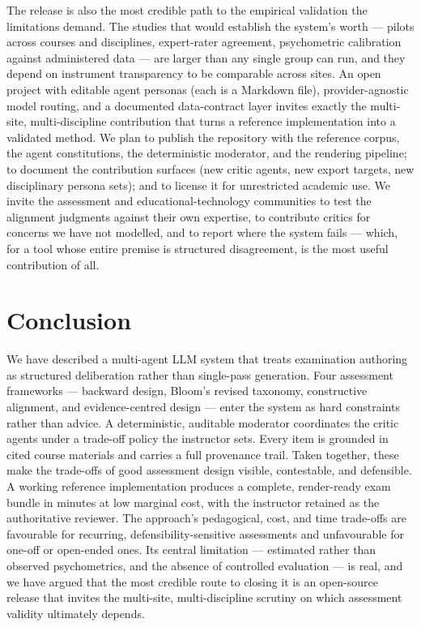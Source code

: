 \documentclass[
  11pt,
  letterpaper,
]{article}
\begin{document}
The release is also the most credible path to the empirical validation
the limitations demand. The studies that would establish the system's
worth --- pilots across courses and disciplines, expert-rater agreement,
psychometric calibration against administered data --- are larger than
any single group can run, and they depend on instrument transparency to
be comparable across sites. An open project with editable agent personas
(each is a Markdown file), provider-agnostic model routing, and a
documented data-contract layer invites exactly the multi-site,
multi-discipline contribution that turns a reference implementation into
a validated method. We plan to publish the repository with the reference
corpus, the agent constitutions, the deterministic moderator, and the
rendering pipeline; to document the contribution surfaces (new critic
agents, new export targets, new disciplinary persona sets); and to
license it for unrestricted academic use. We invite the assessment and
educational-technology communities to test the alignment judgments
against their own expertise, to contribute critics for concerns we have
not modelled, and to report where the system fails --- which, for a tool
whose entire premise is structured disagreement, is the most useful
contribution of all.

\section{Conclusion}\label{conclusion}

We have described a multi-agent LLM system that treats examination
authoring as structured deliberation rather than single-pass generation.
Four assessment frameworks --- backward design, Bloom's revised
taxonomy, constructive alignment, and evidence-centred design --- enter
the system as hard constraints rather than advice. A deterministic,
auditable moderator coordinates the critic agents under a trade-off
policy the instructor sets. Every item is grounded in cited course
materials and carries a full provenance trail. Taken together, these
make the trade-offs of good assessment design visible, contestable, and
defensible. A working reference implementation produces a complete,
render-ready exam bundle in minutes at low marginal cost, with the
instructor retained as the authoritative reviewer. The approach's
pedagogical, cost, and time trade-offs are favourable for recurring,
defensibility-sensitive assessments and unfavourable for one-off or
open-ended ones. Its central limitation --- estimated rather than
observed psychometrics, and the absence of controlled evaluation --- is
real, and we have argued that the most credible route to closing it is
an open-source release that invites the multi-site, multi-discipline
scrutiny on which assessment validity ultimately depends.
\end{document}
